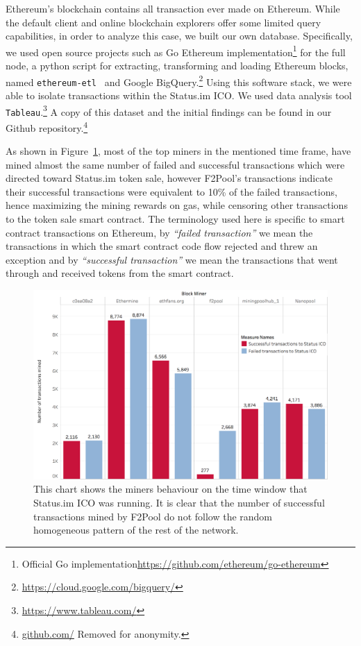 Ethereum's blockchain contains all transaction ever made on Ethereum. While the default client and online blockchain explorers offer some limited query capabilities, in order to analyze this case, we built our own database. Specifically, we used open source projects such as Go Ethereum implementation\footnote{Official Go implementation\url{https://github.com/ethereum/go-ethereum}} for the full node, a python script for extracting, transforming and loading Ethereum blocks, named \texttt{ethereum-etl}~\cite{ethereumetl} and Google BigQuery.\footnote{\url{https://cloud.google.com/bigquery/}} Using this software stack, we were able to isolate transactions within the Status.im ICO. We used data analysis tool \texttt{Tableau}.\footnote{\url{https://www.tableau.com/}} A copy of this dataset and the initial findings can be found in our Github repository.\footnote{\url{github.com/} Removed for anonymity.}

As shown in Figure~\ref{fig:Transactions_miners_while_status_ico_cut}, most of the top miners in the mentioned time frame, have mined almost the same number of failed and successful transactions which were directed toward Status.im token sale, however F2Pool's transactions indicate their successful transactions were equivalent to 10\% of the failed transactions, hence maximizing the mining rewards on gas, while censoring other transactions to the token sale smart contract. The terminology used here is specific to smart contract transactions on Ethereum, by \textit{``failed transaction''} we mean the transactions in which the smart contract code flow rejected and threw an exception and by \textit{``successful transaction''} we mean the transactions that went through and received tokens from the smart contract.


\begin{figure}[t]
\centering
\includegraphics[width=0.7\linewidth]{figures/Transactions_miners_while_status_ico_cut_only_icotx.png}
\caption{ This chart shows the miners behaviour on the time window that Status.im ICO was running. It is clear that the number of successful transactions mined by F2Pool do not follow the random homogeneous pattern of the rest of the network. \label{fig:Transactions_miners_while_status_ico_cut}}
\end{figure}

